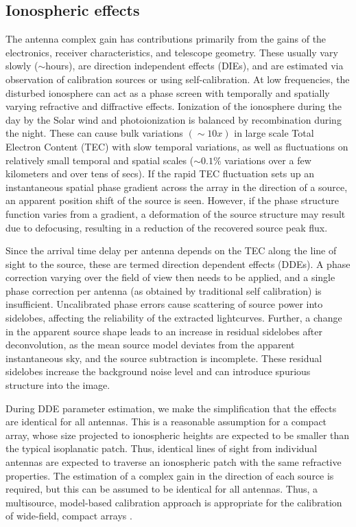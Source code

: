 \documentclass{aa}
\begin{document}
\subsection{\label{sub:All-Sky-cal-iono}Ionospheric effects}

The  antenna complex  gain has  contributions primarily  from the  gains  of the
electronics, receiver characteristics, and telescope geometry. These usually vary
slowly ($\sim$hours), are direction independent effects (DIEs), and are estimated
via  observation  of calibration  sources  or  using  self-calibration.  At  low
frequencies, the disturbed ionosphere can  act as a phase screen with temporally
and  spatially varying refractive  and diffractive  effects.  Ionization  of the
ionosphere during the day by the  Solar wind and photoionization is balanced by
recombination   during   the   night.    These   can   cause   bulk   variations
$\left(\sim10x\right)$  in large scale  Total Electron  Content (TEC)  with slow
temporal variations,  as well as  fluctuations on relatively small  temporal and
spatial scales  ($\sim0.1\%$ variations over a  few kilometers and  over tens of
secs).   If the rapid  TEC fluctuation  sets up  an instantaneous  spatial phase
gradient across  the array in  the direction of  a source, an  apparent position
shift of  the source is seen.   However, if the phase  structure function varies
from  a gradient,  a  deformation of  the  source structure  may  result due  to
defocusing, resulting in a reduction of the recovered source peak flux.

Since the arrival  time delay per antenna  depends on the TEC along  the line of
sight  to the source,  these are  termed direction  dependent effects  (DDEs). A
phase correction varying over the field of  view then needs to be applied, and a
single  phase   correction  per  antenna   (as  obtained  by   traditional  self
calibration)  is insufficient.   Uncalibrated phase  errors cause  scattering of
source  power  into  sidelobes,  affecting  the  reliability  of  the  extracted
lightcurves.  Further, a change in the apparent source shape leads to an increase
in residual  sidelobes after  deconvolution, as the  mean source  model deviates
from   the  apparent   instantaneous  sky,   and  the   source   subtraction  is
incomplete. These  residual sidelobes increase  the background noise  level and
can introduce spurious structure into the image.


During DDE parameter estimation, we make the simplification that the effects are
identical  for all  antennas.  This  is a  reasonable assumption  for  a compact
array, whose  size projected to ionospheric  heights are expected  to be smaller
than  the  typical  isoplanatic  patch.  Thus, identical  lines  of  sight  from
individual antennas are expected to  traverse an ionospheric patch with the same
refractive properties. The estimation of a complex gain in the direction of each
source  is  required,  but  this  can   be  assumed  to  be  identical  for  all
antennas. Thus, a multisource,  model-based calibration approach is appropriate
for      the      calibration       of      wide-field,      compact      arrays
\citep{wijnholds2010calibration}.
\end{document}
